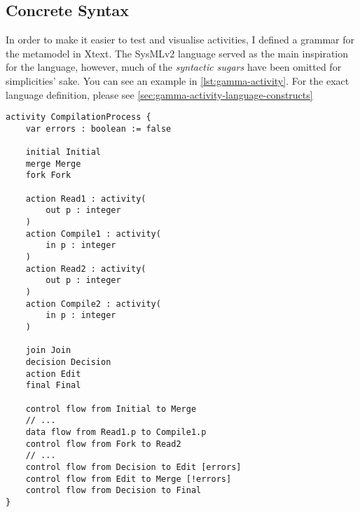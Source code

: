 \subsection{Concrete Syntax}

In order to make it easier to test and visualise activities, I defined a grammar for the metamodel in Xtext. The SysMLv2 language served as the main inspiration for the language, however, much of the \emph{syntactic sugars} have been omitted for simplicities' sake. You can see an example in \autoref{lst:gamma-activity}. For the exact language definition, please see \autoref{sec:gamma-activity-language-constructs}

\begin{lstlisting}[float,language=activity, caption={Gamma Activity Language representation of the compilation activity.}, label={lst:gamma-activity}]
activity CompilationProcess {
	var errors : boolean := false
	
	initial Initial
	merge Merge
	fork Fork
	
	action Read1 : activity(
		out p : integer
	)
	action Compile1 : activity(
		in p : integer
	)
	action Read2 : activity(
		out p : integer
	)
	action Compile2 : activity(
		in p : integer
	)
	
	join Join
	decision Decision
	action Edit
	final Final
	
	control flow from Initial to Merge 
	// ...	
	data flow from Read1.p to Compile1.p
	control flow from Fork to Read2 
	// ...
	control flow from Decision to Edit [errors]
	control flow from Edit to Merge [!errors]
	control flow from Decision to Final
}	
\end{lstlisting}